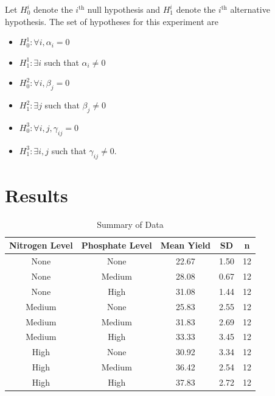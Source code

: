 \documentclass[12pt]{article}
\begin{document}
Let $H^i_0$ denote the $i^\text{th}$ null hypothesis and $H^i_1$ denote the $i^\text{th}$ alternative hypothesis.
The set of hypotheses for this experiment are
\vspace{0.5em}
\begin{itemize}\setlength{\itemsep}{0.5em}
    \item $H^1_0: \forall i, \alpha_i = 0$
    \item $H^1_1: \exists i$ such that $\alpha_i \neq 0$
    \item $H^2_0: \forall i, \beta_j = 0$
    \item $H^2_1: \exists j$ such that $\beta_j \neq 0$
    \item $H^3_0: \forall i, j, \gamma_{ij} = 0$
    \item $H^3_1: \exists i,j$ such that $\gamma_{ij} \neq 0$.
\end{itemize}

\newpage

\section{Results}

\begin{table}[ht]
    \centering
    \caption{Summary of Data}
    \begin{tabular}{c|c|c|c|c}
         \textbf{Nitrogen Level} & \textbf{Phosphate Level} & \textbf{Mean Yield} & \textbf{SD} & \textbf{n}\\ \hline
         None & None & 22.67 & 1.50 & 12\\
         None & Medium & 28.08 & 0.67 & 12\\
         None & High & 31.08 & 1.44 & 12\\
         Medium & None & 25.83 & 2.55 & 12\\
         Medium & Medium & 31.83 & 2.69 & 12\\
         Medium & High & 33.33 & 3.45 & 12\\
         High & None & 30.92 & 3.34 & 12\\
         High & Medium & 36.42 & 2.54 & 12\\
         High & High & 37.83 & 2.72 & 12
    \end{tabular}
\end{table}
\end{document}
